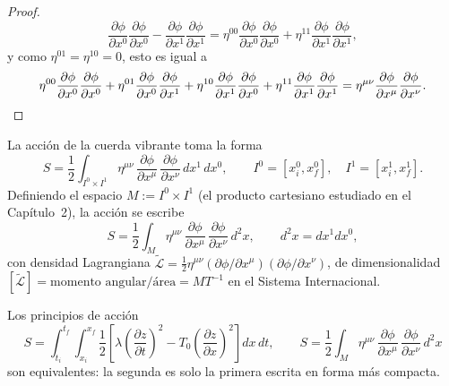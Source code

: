 \begin{proof}
\[
\frac{\partial\phi}{\partial x^0}\frac{\partial\phi}{\partial x^0} -
\frac{\partial\phi}{\partial x^1}\frac{\partial\phi}{\partial x^1} =
\eta^{00}\frac{\partial\phi}{\partial x^0}\frac{\partial\phi}{\partial
x^0} + \eta^{11}\frac{\partial\phi}{\partial x^1}\frac{\partial\phi}
{\partial x^1},
\]
y como $\eta^{01}=\eta^{10}=0$, esto es igual a
\[
\eta^{00}\frac{\partial\phi}{\partial x^0}\frac{\partial\phi}{\partial
x^0} + \eta^{01}\frac{\partial\phi}{\partial x^0}\frac{\partial\phi}
{\partial x^1} + \eta^{10}\frac{\partial\phi}{\partial x^1}\frac{
\partial\phi}{\partial x^0} + \eta^{11}\frac{\partial\phi}{\partial
x^1}\frac{\partial\phi}{\partial x^1} = \eta^{\mu\nu}\frac{\partial
\phi}{\partial x^\mu}\frac{\partial\phi}{\partial x^\nu} . \qedhere
\]
\end{proof}

\begin{proposicionc}
La acción de la cuerda vibrante toma la forma
\[
S = \frac12\int_{I^0\times I^1} \eta^{\mu\nu}\, \frac{\partial\phi}
{\partial x^\mu}\, \frac{\partial\phi}{\partial x^\nu}\, dx^1\,dx^0,
\qquad I^0=[x_i^0,x_f^0],\quad I^1=[x_i^1,x_f^1].
\]
Definiendo el espacio $M := I^0\times I^1$ (el producto cartesiano
estudiado en el Capítulo~2), la acción se escribe
\[
S = \frac12\int_M \eta^{\mu\nu}\, \frac{\partial\phi}{\partial x^\mu}\,
\frac{\partial\phi}{\partial x^\nu}\, d^2x, \qquad d^2x = dx^1dx^0,
\]
con densidad Lagrangiana $\widetilde{\mathscr{L}} = \tfrac12
\eta^{\mu\nu}(\partial\phi/\partial x^\mu)(\partial\phi/\partial
x^\nu)$, de dimensionalidad $[\widetilde{\mathscr{L}}] =
\text{momento angular}/\text{área} = MT^{-1}$ en el Sistema
Internacional.
\end{proposicionc}

\begin{center}
\end{center}

Los principios de acción
\[
S = \int_{t_i}^{t_f}\int_{x_i}^{x_f} \frac12\left[\lambda\left(
\frac{\partial z}{\partial t}\right)^2 - T_0\left(\frac{\partial z}
{\partial x}\right)^2\right] dx\,dt, \qquad S = \frac12\int_M
\eta^{\mu\nu}\, \frac{\partial\phi}{\partial x^\mu}\, \frac{\partial
\phi}{\partial x^\nu}\, d^2x
\]
son equivalentes: la segunda es solo la primera escrita en forma más
compacta.

